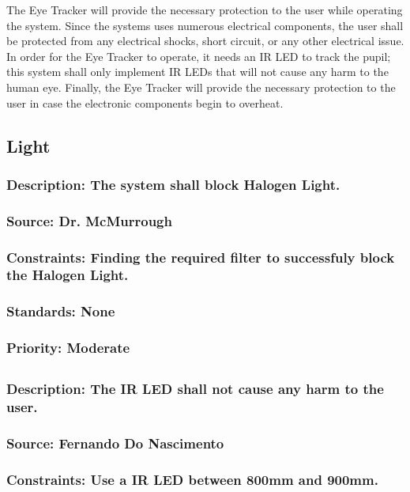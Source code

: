 The Eye Tracker will provide the necessary protection to the user while operating the system. Since the systems uses numerous electrical components, the user shall be protected from any electrical shocks, short circuit, or any other electrical issue. In order for the Eye Tracker to operate, it needs an IR LED to track the pupil; this system shall only implement IR LEDs that will not cause any harm to the human eye. Finally, the Eye Tracker will provide the necessary protection to the user in case the electronic components begin to overheat.

\subsection{\bfHalogen Light}
\subsubsection{Description: The system shall block Halogen Light.}
\subsubsection{Source: Dr. McMurrough}
\subsubsection{Constraints: Finding the required filter to successfuly block the Halogen Light.}
\subsubsection{Standards: None}
\subsubsection{Priority: Moderate}

\subsection{\bfLED}
\subsubsection{Description: The IR LED shall not cause any harm to the user.}
\subsubsection{Source: Fernando Do Nascimento}
\subsubsection{Constraints: Use a IR LED between 800mm and 900mm.}
